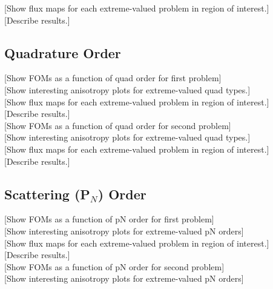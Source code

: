 [Show flux maps for each extreme-valued problem in region of interest.] \\

[Describe results.] \\

\subsection{Quadrature Order}
\label{subsec:quadorder}
[Show FOMs as a function of quad order for first problem] \\

[Show interesting anisotropy plots for extreme-valued quad types.] \\

[Show flux maps for each extreme-valued problem in region of interest.] \\

[Describe results.] \\

[Show FOMs as a function of quad order for second problem] \\

[Show interesting anisotropy plots for extreme-valued quad types.] \\

[Show flux maps for each extreme-valued problem in region of interest.] \\

[Describe results.] \\

\subsection{Scattering (P$_N$) Order}
\label{subsec:pnorder}
[Show FOMs as a function of pN order for first problem] \\

[Show interesting anisotropy plots for extreme-valued pN orders] \\

[Show flux maps for each extreme-valued problem in region of interest.] \\

[Describe results.] \\

[Show FOMs as a function of pN order for second problem] \\

[Show interesting anisotropy plots for extreme-valued pN orders] \\

